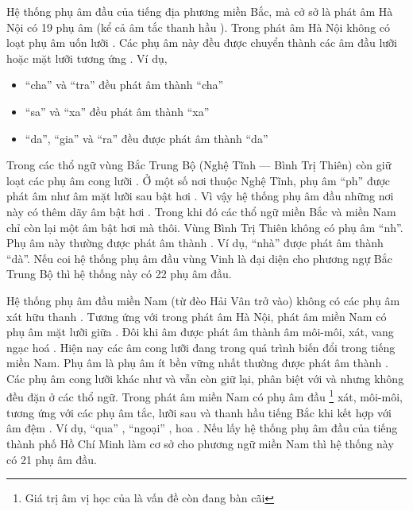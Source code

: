 \documentclass[a4paper,oneside,14pt]{extbook} %
\begin{document}
Hệ thống phụ âm đầu của tiếng địa phương miền Bắc, mà cở sở là phát âm
Hà Nội có 19 phụ âm (kể cả âm tắc thanh hầu ). Trong phát
âm Hà Nội không có loạt phụ âm uốn lưỡi . Các
phụ âm này đều được chuyển thành các âm đầu lưỡi hoặc mặt lưỡi tương
ứng . Ví dụ,
\begin{itemize}
\item ``cha'' và ``tra'' đều phát âm thành ``cha'' 
\item ``sa'' và ``xa'' đều phát âm thành ``xa'' 
\item ``da'', ``gia'' và ``ra'' đều được phát âm thành ``da'' 
\end{itemize}

Trong các thổ ngữ vùng Bắc Trung Bộ (Nghệ Tĩnh --- Bình Trị Thiên) còn
giữ loạt các phụ âm cong lưỡi . Ở một số nơi
thuộc Nghệ Tĩnh, phụ âm ``ph'' được phát âm như âm mặt lưỡi sau bật
hơi . Vì vậy hệ thống phụ âm đầu những nơi này
có thêm dãy âm bật hơi . Trong khi đó các thổ ngữ miền Bắc và miền Nam chỉ còn
lại một âm bật hơi  mà thôi. Vùng Bình Trị Thiên
không có phụ âm ``nh''. Phụ âm này thường được phát âm thành
. Ví dụ, ``nhà'' được phát âm thành ``dà''. Nếu coi hệ
thống phụ âm đầu vùng Vinh là đại diện cho phương ngự Bắc Trung Bộ thì
hệ thống này có 22 phụ âm đầu.

Hệ thống phụ âm đầu miền Nam (từ đèo Hải Vân trở vào) không có các phụ
âm xát hữu thanh . Tương ứng với 
trong phát âm Hà Nội, phát âm miền Nam có phụ âm mặt lưỡi giữa
. Đôi khi âm  được phát âm thành âm môi-môi,
xát, vang ngạc hoá . Hiện nay các âm cong lưỡi đang
trong quá trình biến đổi trong tiếng miền Nam. Phụ âm 
là phụ âm ít bền vững nhất thường được phát âm thành
. Các phụ âm cong lưỡi khác như  và
 vẫn còn giữ lại, phân biệt với  và
 nhưng không đều đặn ở các thổ ngữ. Trong phát âm miền
Nam có phụ âm đầu \footnote{Giá trị âm vị học của
   là vấn đề còn đang bàn cãi} xát, môi-môi, tương ứng
với các phụ âm tắc, lưỡi sau và thanh hầu tiếng Bắc khi kết hợp với âm
đệm . Ví dụ, ``qua'' , ``ngoại''
, hoa . Nếu lấy hệ thống phụ âm đầu của
tiếng thành phố Hồ Chí Minh làm cơ sở cho phương ngữ miền Nam thì hệ
thống này có 21 phụ âm đầu.
\end{document}
